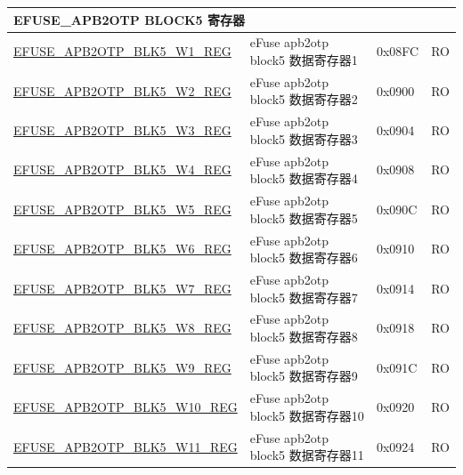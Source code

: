 \begin{longtable}{ | p{7cm} | p{6cm} | p{1.2cm} | p{1.5cm} | }
\multicolumn{4}{|l|}{\textbf{EFUSE\_APB2OTP BLOCK5 寄存器}} \\ \hline
\hyperref[regdesc:EFUSEAPB2OTPBLK5WNREG]{EFUSE\_APB2OTP\_BLK5\_W1\_REG} & eFuse apb2otp block5 数据寄存器1 & 0x08FC & RO \\\hline
\hyperref[regdesc:EFUSEAPB2OTPBLK5WNREG]{EFUSE\_APB2OTP\_BLK5\_W2\_REG} & eFuse apb2otp block5 数据寄存器2 & 0x0900 & RO \\\hline
\hyperref[regdesc:EFUSEAPB2OTPBLK5WNREG]{EFUSE\_APB2OTP\_BLK5\_W3\_REG} & eFuse apb2otp block5 数据寄存器3 & 0x0904 & RO \\\hline
\hyperref[regdesc:EFUSEAPB2OTPBLK5WNREG]{EFUSE\_APB2OTP\_BLK5\_W4\_REG} & eFuse apb2otp block5 数据寄存器4 & 0x0908 & RO \\\hline
\hyperref[regdesc:EFUSEAPB2OTPBLK5WNREG]{EFUSE\_APB2OTP\_BLK5\_W5\_REG} & eFuse apb2otp block5 数据寄存器5 & 0x090C & RO \\\hline
\hyperref[regdesc:EFUSEAPB2OTPBLK5WNREG]{EFUSE\_APB2OTP\_BLK5\_W6\_REG} & eFuse apb2otp block5 数据寄存器6 & 0x0910 & RO \\\hline
\hyperref[regdesc:EFUSEAPB2OTPBLK5WNREG]{EFUSE\_APB2OTP\_BLK5\_W7\_REG} & eFuse apb2otp block5 数据寄存器7 & 0x0914 & RO \\\hline
\hyperref[regdesc:EFUSEAPB2OTPBLK5WNREG]{EFUSE\_APB2OTP\_BLK5\_W8\_REG} & eFuse apb2otp block5 数据寄存器8 & 0x0918 & RO \\\hline
\hyperref[regdesc:EFUSEAPB2OTPBLK5WNREG]{EFUSE\_APB2OTP\_BLK5\_W9\_REG} & eFuse apb2otp block5 数据寄存器9 & 0x091C & RO \\\hline
\hyperref[regdesc:EFUSEAPB2OTPBLK5WNREG]{EFUSE\_APB2OTP\_BLK5\_W10\_REG} & eFuse apb2otp block5 数据寄存器10 & 0x0920 & RO \\\hline
\hyperref[regdesc:EFUSEAPB2OTPBLK5WNREG]{EFUSE\_APB2OTP\_BLK5\_W11\_REG} & eFuse apb2otp block5 数据寄存器11 & 0x0924 & RO \\\hline


\end{longtable}
